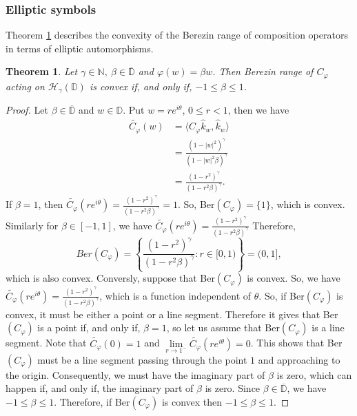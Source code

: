 \documentclass[12pt, reqno]{amsart}
\newtheorem{theorem}{Theorem}[section]
\theoremstyle{definition}
\theoremstyle{remark}
\numberwithin{equation}{section}
\begin{document}
\subsubsection{\bf Elliptic symbols}
Theorem \ref{Thm_Convexity_1} describes the convexity of the Berezin range of composition operators in terms of elliptic automorphisms. 
\begin{theorem}\label{Thm_Convexity_1}
	Let $\gamma \in \mathbb{N},~ \beta\in \overline{\mathbb{D}}$ and $\varphi(w)=\beta w$. Then Berezin range of $C_\varphi$ acting on $\mathcal{H}_\gamma(\mathbb{D})$ is convex if, and only if, $-1\leq \beta\leq 1$.
\end{theorem} 
\begin{proof}
Let	$\beta\in \overline{\mathbb{D}}$ and $w\in \mathbb{D}$. Put $w=re^{i\theta}$, $0\leq r<1$, then we have
	\begin{align*}
\widetilde{C_\varphi}(w)&=\langle C_\varphi \widehat{k}_w, \widehat{k}_w \rangle\\
&=\frac{(1-|w|^2)^\gamma}{(1-|w|^2\beta)^\gamma}\\
&=\frac{(1-r^2)^\gamma}{(1-r^2\beta)^\gamma}.	
\end{align*}
If $\beta=1$, then $\widetilde{C_\varphi}(re^{i\theta})=\frac{(1-r^2)^\gamma}{(1-r^2\beta)^\gamma}=1$.
So, Ber$(C_\varphi)=\{1\}$, which is convex. Similarly for $\beta\in [-1, 1]$, we have
$\widetilde{C_\varphi}(re^{i\theta})=\frac{(1-r^2)^\gamma}{(1-r^2\beta)^\gamma}$ 
Therefore, $$Ber(C_\varphi)=\left\{\frac{(1-r^2)^\gamma}{(1-r^2\beta)^\gamma}: r\in [0, 1)\right\}=(0, 1],$$ which is also convex.
Conversly, suppose that Ber$(C_\varphi)$ is convex. So, we have  $\widetilde{C_\varphi}(re^{i\theta})=\frac{(1-r^2)^\gamma}{(1-r^2\beta)^\gamma}$, which is a function independent of $\theta$. So, if Ber$(C_\varphi)$ is convex, it must be either a point or a line segment. Therefore it gives that Ber$(C_\varphi)$ is a point if, and only if, $\beta=1$, so let us assume that Ber$(C_\varphi)$ is a line segment. Note that $\widetilde{C_\varphi}(0)=1$ and $\lim\limits_{r\rightarrow 1^-}\widetilde{C_\varphi}(re^{i\theta})=0$. This shows that Ber$(C_\varphi)$ must be a line segment passing through the point $1$ and approaching to the origin. Consequently, we must have the imaginary part of $\beta$ is zero, which can happen if, and only if, the imaginary part of $\beta$ is zero. Since $\beta\in \overline{\mathbb{D}}$, we have $-1\leq \beta\leq 1$. Therefore, if Ber$(C_\varphi)$ is convex then $-1\leq \beta \leq 1$. 
\end{proof}
\end{document}
